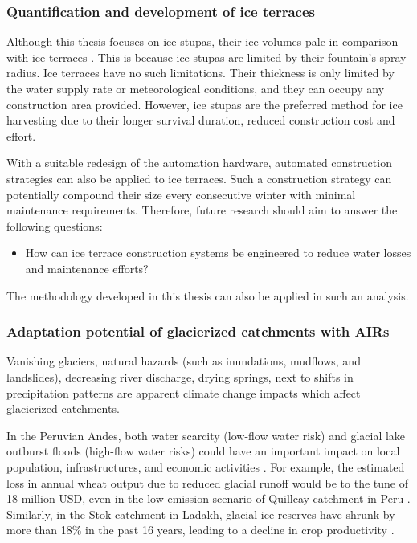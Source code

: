\subsubsection{Quantification and development of ice terraces}

Although this thesis focuses on ice stupas, their ice volumes pale in comparison with ice terraces
\citep{nusserSociohydrologyArtificialGlaciers2019}. This is because ice stupas are limited by their fountain's
spray radius. Ice terraces have no such limitations. Their thickness is only limited by the water
supply rate or meteorological conditions, and they can occupy any construction area provided. However, ice stupas
are the preferred method for ice harvesting due to their longer survival duration, reduced construction cost and
effort.

With a suitable redesign of the automation hardware, automated construction strategies can also be applied to
ice terraces. Such a construction strategy can potentially compound their size every consecutive winter with
minimal maintenance requirements. Therefore, future research should aim to answer the following
questions:

\begin{itemize}

	\item How can ice terrace construction systems be engineered to reduce water losses and maintenance
	      efforts?

\end{itemize}

The methodology developed in this thesis can also be applied in such an analysis.

\subsubsection{Adaptation potential of glacierized catchments with \ac{AIRs}}

Vanishing glaciers, natural hazards (such as inundations, mudflows, and landslides), decreasing river discharge,
drying springs, next to shifts in precipitation patterns are apparent climate change impacts which affect
glacierized catchments.

In the Peruvian Andes, both water scarcity (low-flow water risk) and glacial lake outburst floods (high-flow
water risks) could have an important impact on local population, infrastructures, and economic activities
\citep{motschmannIntegratedAssessmentsWater2020}. For example, the estimated loss in annual wheat output due to
reduced glacial runoff would be to the tune of 18 million USD, even in the low emission scenario of Quillcay
catchment in Peru \citep{motschmannLossesDamagesConnected2020}. Similarly, in the Stok catchment in Ladakh,
glacial ice reserves have shrunk by more than 18\% in the past 16 years, leading to a decline in crop
productivity \citep{sohebSpatiotemporalQuantificationKey2022}.

